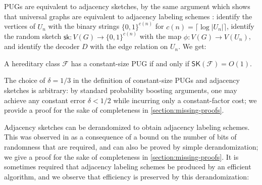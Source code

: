 \documentclass{theoretics}
\makeatletter
\DeclareMathOperator{\poly}{poly}
\newcommand{\ceil}[1]{\ensuremath{\lceil #1 \rceil}}
\newcommand{\zo}{\{0,1\}}
\newcommand{\cF}{\ensuremath{\mathcal{F}}}
\newcommand{\bN}{\ensuremath{\mathbb{N}}}
\newcommand{\sk}{\mathsf{sk}}
\newcommand{\RL}{\mathsf{SK}}
\newcommand\IfRestateTF{%
  \ifx\label\thmt@gobble@label %
    \expandafter\@firstoftwo
  \else
    \expandafter\@secondoftwo
  \fi
}
\newcommand{\RestateRemark}{\IfRestateTF{{\normalfont\bfseries (Restated) }}{}}
\makeatother
\begin{document}
PUGs are equivalent to adjacency sketches, by the same argument which shows that universal graphs
are equivalent to adjacency labeling schemes \cite{KNR92}: identify the
vertices of $U_n$ with the binary strings $\zo^{c(n)}$ for $c(n) = \ceil{\log |U_n|}$, identify the
random sketch $\sk : V(G) \to \zo^{c(n)}$ with the map $\phi : V(G) \to V(U_n)$, and identify the
decoder $D$ with the edge relation on $U_n$. We get:

\begin{proposition}
\label{prop:pug labeling equivalence}
A hereditary class $\cF$ has a constant-size PUG if and only if $\RL(\cF) = O(1)$.
\end{proposition}

The choice of $\delta=1/3$ in the definition of constant-size PUGs and adjacency sketches
is arbitrary: by standard probability boosting arguments, one may achieve any constant error
$\delta < 1/2$ while incurring only a constant-factor cost; we provide a proof for the sake of
completeness in \cref{section:missing-proofs}.


Adjacency sketches can be derandomized to obtain adjacency labeling schemes. This was observed in
\cite{Har20} as a consequence of a bound on the number of bits of randomness that are required, and
can also be proved by simple derandomization; we give a proof for the sake of completeness in
\cref{section:missing-proofs}. It is sometimes required that adjacency labeling schemes be produced by
an efficient algorithm, and we observe that efficiency is preserved by this derandomization:

\end{document}
